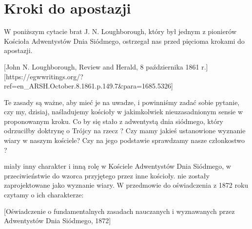 \chapter{Kroki do apostazji}

W poniższym cytacie brat J. N. Loughborough, który był jednym z pionierów Kościoła Adwentystów Dnia Siódmego, ostrzegał nas przed pięcioma krokami do apostazji.

[John N. Loughborough, Review and Herald, 8 października 1861 r.][https://egwwritings.org/?ref=en\_ARSH.October.8.1861.p.149.7&para=1685.5326]

Te zasady są ważne, aby mieć je na uwadze, i powinniśmy zadać sobie pytanie, czy my, dzisiaj, naśladujemy kościoły w jakimkolwiek nieuzasadnionym sensie w proponowanym kroku. Co by się stało z adwentystą dnia siódmego, który odrzuciłby doktrynę o Trójcy na rzecz ? Czy mamy jakieś ustanowione wyznanie wiary w naszym kościele? Czy na jego podstawie sprawdzamy nasze członkostwo ?


 miały inny charakter i inną rolę w Kościele Adwentystów Dnia Siódmego, w przeciwieństwie do wzorca przyjętego przez inne kościoły.  nie zostały zaprojektowane jako wyznanie wiary. W przedmowie do oświadczenia z 1872 roku czytamy o ich charakterze:

[Oświadczenie o fundamentalnych zasadach nauczanych i wyznawanych przez Adwentystów Dnia Siódmego, 1872]

